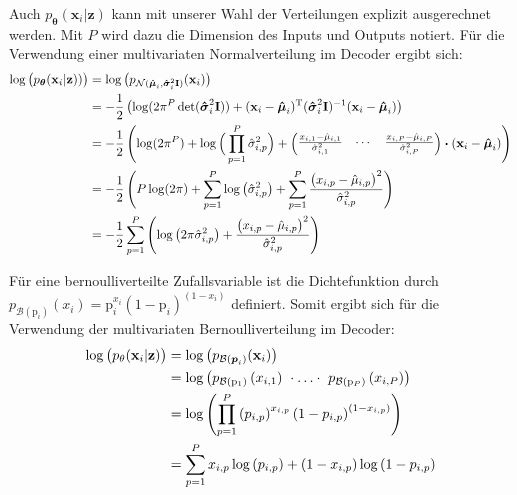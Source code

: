 \documentclass[12pt]{article}
\newcommand{\pdec}{p_{\boldsymbol\theta}(\mathbf{x}_i|\mathbf{z})}
\begin{document}
	Auch $\pdec$ kann mit unserer Wahl der Verteilungen explizit ausgerechnet werden.
	Mit $P$ wird dazu die Dimension des Inputs und Outputs notiert.
	Für die Verwendung einer multivariaten Normalverteilung im Decoder ergibt sich:
	\begin{align*}
	\log\big(\pdec)\big) &=  \log\big(p_{\mathcal{N}(\boldsymbol{\hat{\mu}}_{i},\boldsymbol{\hat{\sigma}}_{i}^{2}\textbf{I})}(\textbf{x}_{i})\big)\notag \\
	&= -\frac{1}{2}\left(\log(2\pi^{P} \det(\boldsymbol{\hat{\sigma}}_{i}^{2}\textbf{I}))+(\textbf{x}_{i}-\boldsymbol{\hat{\mu}}_{i})^{\mathrm{T}}(\boldsymbol{\hat{\sigma}}_{i}^{2}\textbf{I})^{-1}(\textbf{x}_{i}-\boldsymbol{\hat{\mu}}_{i})\right) \notag \\
	&= -\frac{1}{2}\left(\log(2\pi^{P})+\log\Big( \prod_{p=1}^{P}\hat{\sigma}_{i,p}^{2}\Big)+  \begin{pmatrix}  \frac{x_{i,1}-\hat{\mu}_{i,1}}{\hat{\sigma}_{i,1}^{2}}&\cdots& \frac{x_{i,P}-\hat{\mu}_{i,P}}{\hat{\sigma}_{i,P}^{2}}\end{pmatrix}
	\boldsymbol{\cdot}(\textbf{x}_{i}-\boldsymbol{\hat{\mu}}_{i})\right) \notag \\
	&= -\frac{1}{2}\left(P\log(2\pi)+\sum_{p=1}^{P}\log\left( \hat{\sigma}_{i,p}^{2}\right)+
	\sum_{p=1}^{P}\frac{\big(x_{i,p}-\hat{\mu}_{i,p}\big)^{2}}{\hat{\sigma}_{i,p}^{2}}\right) \notag \\
	&= -\frac{1}{2}\sum_{p=1}^{P} \left(\log\left(2\pi \hat{\sigma}_{i,p}^{2}\right) + \frac{\big(x_{i,p}-\hat{\mu}_{i,p}\big)^{2}}{\hat{\sigma}_{i,p}^{2}}\right)
	\end{align*}
	
	Für eine bernoulliverteilte Zufallsvariable ist die Dichtefunktion  durch $p_{\mathcal{B}(\mathrm{p}_{i})}(x_{i}) = \mathrm{p}_{i}^{x_{i}}(1-\mathrm{p}_{i})^{(1-x_{i})}$ definiert. Somit ergibt sich für die Verwendung der multivariaten Bernoulliverteilung im Decoder: \\
	\begin{align*}
	\log\big(p_{\theta}(\textbf{x}_{i}|\textbf{z})\big) &=  \log\big(p_{\mathcal{B}(\boldsymbol{p}_{i})}(\textbf{x}_{i})\big)\notag \\
	&= \log\left(p_{\mathcal{B}(\mathrm{p}_{1})}\left(x_{i,1}\right)\ \cdot\ldots\cdot \ p_{\mathcal{B}(\mathrm{p}_{P})}\left(x_{i,P}\right)\right)\notag \\
	&= \log\left(\prod_{p=1}^{P}\left(p_{i,p}\right)^{x_{i,p}}\left(1-p_{i,p}\right)^{\left(1-x_{i,p}\right)}\right) \notag \\
	&=  \sum_{p=1}^{P}x_{i,p}\log\left(p_{i,p}\right)+\left(1-x_{i,p}\right)\log\left(1-p_{i,p}\right)
	\end{align*}
\end{document}
